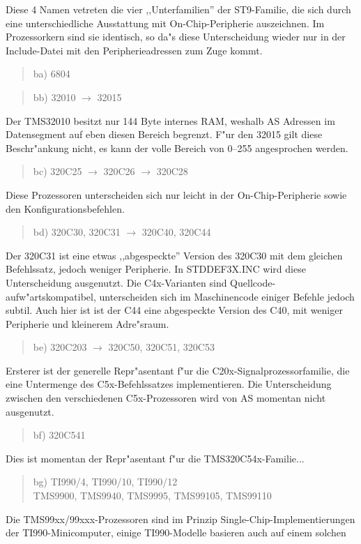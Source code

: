 \documentclass[12pt,a4paper,twoside]{report}
\begin{document}
Diese 4 Namen vetreten die vier ,,Unterfamilien'' der ST9-Familie, die
sich durch eine unterschiedliche Ausstattung mit On-Chip-Peripherie
auszeichnen.  Im Prozessorkern sind sie identisch, so da"s diese
Unterscheidung wieder nur in der Include-Datei mit den Peripherieadressen zum
Zuge kommt.
\begin{quote}
ba) 6804
\end{quote}
\begin{quote}
bb) 32010 $\rightarrow$ 32015
\end{quote}
Der TMS32010 besitzt nur 144 Byte internes RAM, weshalb AS Adressen im
Datensegment auf eben diesen Bereich begrenzt.  F"ur den 32015 gilt diese
Beschr"ankung nicht, es kann der volle Bereich von 0--255 angesprochen
werden.
\begin{quote}
bc) 320C25 $\rightarrow$ 320C26 $\rightarrow$ 320C28
\end{quote}
Diese Prozessoren unterscheiden sich nur leicht in der
On-Chip-Peripherie sowie den Konfigurationsbefehlen.
\begin{quote}
bd) 320C30, 320C31 $\rightarrow$ 320C40, 320C44
\end{quote}
Der 320C31 ist eine etwas ,,abgespeckte'' Version des 320C30 mit dem
gleichen Befehlssatz, jedoch weniger Peripherie.  In STDDEF3X.INC
wird diese Unterscheidung ausgenutzt.  Die C4x-Varianten sind
Quellcode-aufw"artskompatibel, unterscheiden sich im
Maschinencode einiger Befehle jedoch subtil.  Auch hier ist ist
der C44 eine abgespeckte Version des C40, mit weniger Peripherie
und kleinerem Adre"sraum.
\begin{quote}
be) 320C203 $\rightarrow$ 320C50, 320C51, 320C53
\end{quote}
Ersterer ist der generelle Repr"asentant f"ur die
C20x-Signalprozessorfamilie, die eine Untermenge des C5x-Befehlssatzes
implementieren.  Die Unterscheidung zwischen den verschiedenen
C5x-Prozessoren wird von AS momentan nicht ausgenutzt.
\begin{quote}
bf) 320C541
\end{quote}
Dies ist momentan der Repr"asentant f"ur die TMS320C54x-Familie...
\begin{quote}
bg) TI990/4, TI990/10, TI990/12 \\
    TMS9900, TMS9940, TMS9995, TMS99105, TMS99110
\end{quote}
Die TMS99xx/99xxx-Prozessoren sind im Prinzip Single-Chip-Implementierungen
der TI990-Minicomputer, einige TI990-Modelle basieren auch auf einem solchen
\end{document}
